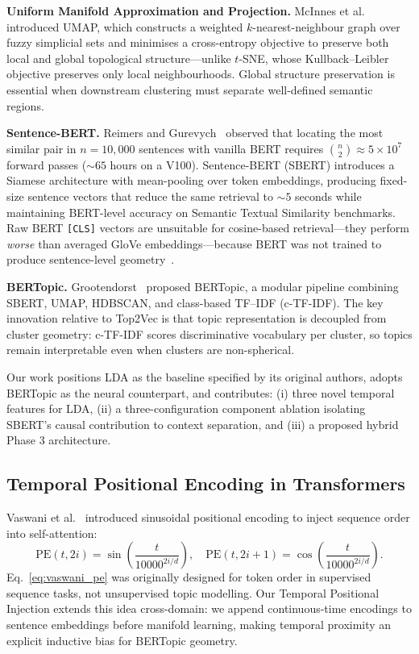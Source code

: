 \documentclass[10pt,twocolumn,a4paper]{article}
\begin{document}
\textbf{Uniform Manifold Approximation and Projection.} McInnes et al.~\cite{mcinnes2018} introduced UMAP, which constructs a weighted $k$-nearest-neighbour graph over fuzzy simplicial sets and minimises a cross-entropy objective to preserve both local and global topological structure---unlike $t$-SNE, whose Kullback--Leibler objective preserves only local neighbourhoods. Global structure preservation is essential when downstream clustering must separate well-defined semantic regions.

\textbf{Sentence-BERT.} Reimers and Gurevych~\cite{reimers2019} observed that locating the most similar pair in $n=10{,}000$ sentences with vanilla BERT requires $\binom{n}{2} \approx 5 \times 10^{7}$ forward passes ($\sim 65$ hours on a V100). Sentence-BERT (SBERT) introduces a Siamese architecture with mean-pooling over token embeddings, producing fixed-size sentence vectors that reduce the same retrieval to $\sim 5$ seconds while maintaining BERT-level accuracy on Semantic Textual Similarity benchmarks. Raw BERT \texttt{[CLS]} vectors are unsuitable for cosine-based retrieval---they perform \emph{worse} than averaged GloVe embeddings---because BERT was not trained to produce sentence-level geometry~\cite{reimers2019}.

\textbf{BERTopic.} Grootendorst~\cite{grootendorst2022} proposed BERTopic, a modular pipeline combining SBERT, UMAP, HDBSCAN, and class-based TF--IDF (c-TF-IDF). The key innovation relative to Top2Vec is that topic representation is decoupled from cluster geometry: c-TF-IDF scores discriminative vocabulary per cluster, so topics remain interpretable even when clusters are non-spherical.

Our work positions LDA as the baseline specified by its original authors, adopts BERTopic as the neural counterpart, and contributes: (i) three novel temporal features for LDA, (ii) a three-configuration component ablation isolating SBERT's causal contribution to context separation, and (iii) a proposed hybrid Phase 3 architecture.

\subsection{Temporal Positional Encoding in Transformers}
\label{sec:related_tpe}

Vaswani et al.~\cite{vaswani2017} introduced sinusoidal positional encoding to inject sequence order into self-attention:
\begin{equation}
\label{eq:vaswani_pe}
\text{PE}(t, 2i)=\sin\!\left(\frac{t}{10000^{2i/d}}\right),\quad
\text{PE}(t, 2i{+}1)=\cos\!\left(\frac{t}{10000^{2i/d}}\right).
\end{equation}
Eq.~\eqref{eq:vaswani_pe} was originally designed for token order in supervised sequence tasks, not unsupervised topic modelling. Our Temporal Positional Injection extends this idea cross-domain: we append continuous-time encodings to sentence embeddings before manifold learning, making temporal proximity an explicit inductive bias for BERTopic geometry.
\end{document}
